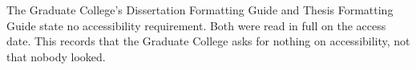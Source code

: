

	{The Graduate College's Dissertation Formatting Guide and Thesis Formatting
	 Guide state no accessibility requirement. Both were read in full on the
	 access date. This records that the Graduate College asks for nothing on
	 accessibility, not that nobody looked.}

\newcommand{\ua@major}{}
\newcommand{\uamajor}[1]{\renewcommand{\ua@major}{#1}}

